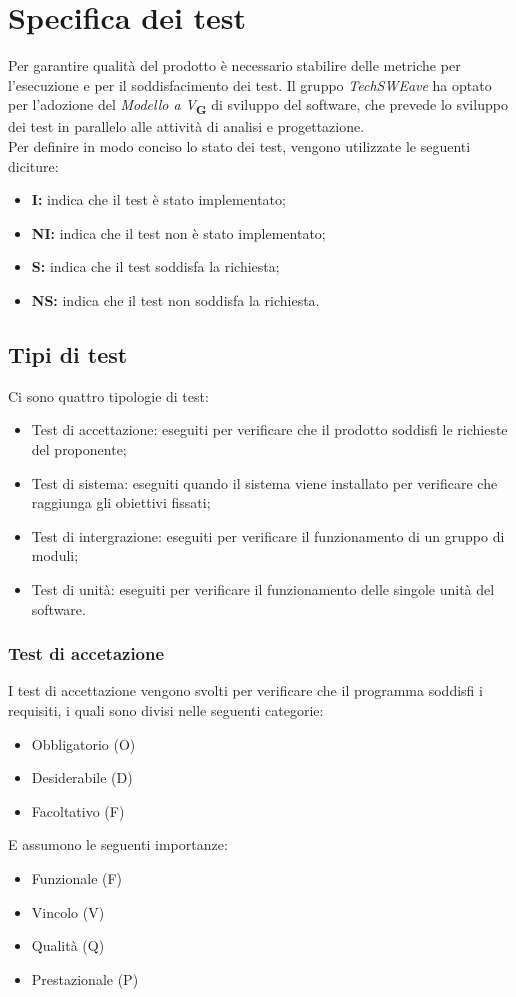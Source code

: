 \section{Specifica dei test}
Per garantire qualità del prodotto è necessario stabilire delle metriche per l’esecuzione e per il soddisfacimento dei test. 
Il gruppo \textit{TechSWEave} ha optato per l'adozione del \textit{Modello a V}\textsubscript{\textbf{G}} di sviluppo del software, che 
prevede lo sviluppo dei test in parallelo alle attività di analisi e progettazione.\\
Per definire in modo conciso lo stato dei test, vengono utilizzate le seguenti diciture:
\begin{itemize}
    \item \textbf{I:} indica che il test è stato implementato;
    \item \textbf{NI:} indica che il test non è stato implementato;
    \item \textbf{S:} indica che il test soddisfa la richiesta;
    \item \textbf{NS:} indica che il test non soddisfa la richiesta.
\end{itemize}
\subsection{Tipi di test}
Ci sono quattro tipologie di test:
\begin{itemize}
    \item Test di accettazione: eseguiti per verificare che il prodotto soddisfi le richieste del proponente;
    \item Test di sistema: eseguiti quando il sistema viene installato per verificare che raggiunga gli obiettivi fissati;
    \item Test di intergrazione: eseguiti per verificare il funzionamento di un gruppo di moduli;
    \item Test di unit\`a: eseguiti per verificare il funzionamento delle singole unit\`a del software.
\end{itemize}
\subsubsection{Test di accetazione}
I test di accettazione vengono svolti per verificare che il programma soddisfi i requisiti, i quali sono divisi nelle seguenti categorie:
\begin{itemize}
    \item Obbligatorio (O)
    \item Desiderabile (D)
    \item Facoltativo (F)
\end{itemize}
E assumono le seguenti importanze:
\begin{itemize}
    \item Funzionale (F)
    \item Vincolo (V)
    \item Qualit\`a (Q)
    \item Prestazionale (P)
\end{itemize}

